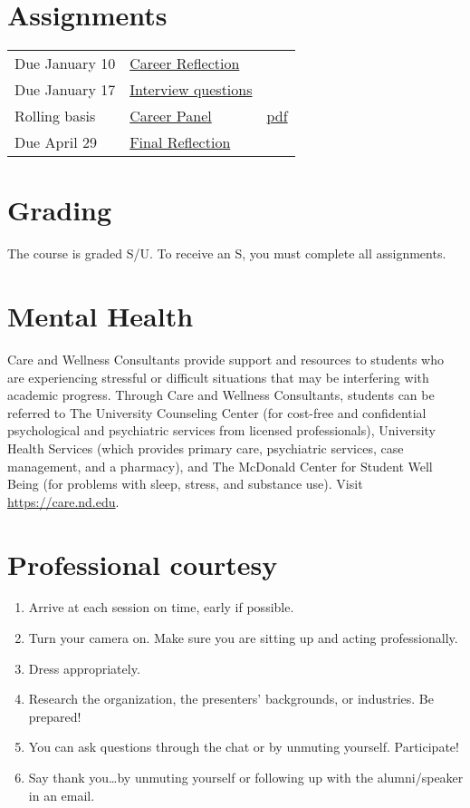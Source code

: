 \documentclass[11pt]{article}
\begin{document}
\section{Assignments}
\label{sec:org079724f}
\begin{center}
\begin{tabular}{lll}
Due January 10 & \href{https://forms.gle/TsqC2PDdJU14JwN49}{Career Reflection} & \\
Due January 17 & \href{https://forms.gle/yRDjwjk5mkxFGZTt8}{Interview questions} & \\
Rolling basis & \href{./Assignments/Interview.org}{Career Panel} & \href{./Assignments/Interview.pdf}{pdf}\\
Due April 29 & \href{https://forms.gle/GjdNjfbhfEXnvLEF6}{Final Reflection} & \\
\end{tabular}
\end{center}

\section{Grading}
\label{sec:org63b1778}
The course is graded S/U. To receive an S, you must complete all assignments.

\section{Mental Health}
\label{sec:org0b29cee}
Care and Wellness Consultants provide support and resources to students who are experiencing stressful or difficult situations that may be interfering with academic progress. Through Care and Wellness Consultants, students can be referred to The University Counseling
Center (for cost-free and confidential psychological and psychiatric services from
licensed professionals), University Health Services (which provides primary care,
psychiatric services, case management, and a pharmacy), and The McDonald
Center for Student Well Being (for problems with sleep, stress, and substance
use). Visit \url{https://care.nd.edu}.

\section{Professional courtesy}
\label{sec:org513749d}
\begin{enumerate}
\item Arrive at each session on time, early if possible.
\item Turn your camera on. Make sure you are sitting up and acting professionally.
\item Dress appropriately.
\item Research the organization, the presenters’ backgrounds, or industries. Be prepared!
\item You can ask questions through the chat or by unmuting yourself. Participate!
\item Say thank you\ldots{}by unmuting yourself or following up with the alumni/speaker in an email.
\end{enumerate}
\end{document}
